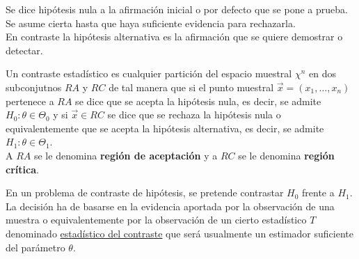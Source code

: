 \begin{definición} 
    Se dice hipótesis nula a la afirmación inicial o por defecto que se pone a prueba. Se asume cierta hasta que haya suficiente evidencia para rechazarla. \\
    En contraste la hipótesis alternativa es la afirmación que se quiere demostrar o detectar. 
\end{definición}


\begin{definición} 
    Un contraste estadístico es cualquier partición del espacio muestral $\chi^{n}$ en dos subconjutnos $RA$ y $RC$ de tal manera que si el punto muestral $\vec{x} = (x_1, \ldots, x_n)$ pertenece a $RA$ se dice que se acepta la hipótesis nula, es decir, se admite $H_0: \theta \in \Theta_0$ y si $\vec{x} \in RC$ se dice que se rechaza la hipótesis nula o equivalentemente que se acepta la hipótesis alternativa, es decir, se admite $H_1: \theta \in \Theta_1$. \\ 
    A $RA$ se le denomina \textbf{región de aceptación} y a $RC$ se le denomina \textbf{región crítica}. 
\end{definición}


\begin{definición}
    En un problema de contraste de hipótesis, se pretende contrastar $H_0$ frente a $H_1$. La decisión ha de basarse en la evidencia aportada por la observación de una muestra o equivalentemente por la observación de un cierto estadístico $T$ denominado \underline{estadístico del contraste} que será usualmente un estimador suficiente del parámetro $\theta$.
\end{definición}


